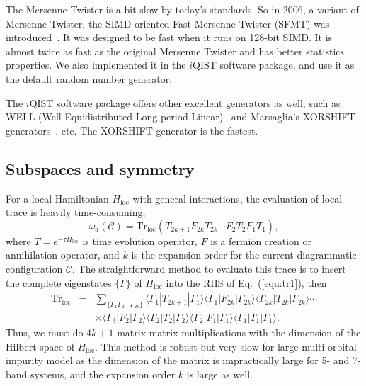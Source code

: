 The Mersenne Twister is a bit slow by today's standards. So in 2006, a variant of Mersenne Twister, the SIMD-oriented Fast Mersenne Twister (SFMT) was introduced~\cite{sfmt:2008}. It was designed to be fast when it runs on 128-bit SIMD. It is almost twice as fast as the original Mersenne Twister and has better statistics properties. We also implemented it in the $i$QIST software package, and use it as the default random number generator.

The $i$QIST software package offers other excellent generators as well, such as WELL (Well Equidistributed Long-period Linear)~\cite{Panneton:2006} and Marsaglia's XORSHIFT generators~\cite{Marsaglia:2003}, etc. The XORSHIFT generator is the fastest.

\subsection{Subspaces and symmetry}
For a local Hamiltonian $H_{\text{loc}}$ with general interactions, the evaluation of local trace is heavily time-consuming,
\begin{equation}
\label{equ:tr1}
\omega_{d}(\mathcal{C}) = 
\text{Tr}_{\text{loc}} (T_{2k+1}F_{2k}T_{2k} \cdots F_{2}T_{2}F_{1}T_{1}),
\end{equation}  
where $T=e^{-\tau H_{\text{loc}}}$ is time evolution operator, $F$ is a fermion creation or annihilation operator, and $k$ is the expansion order for the current diagrammatic configuration $\mathcal{C}$. The straightforward method to evaluate this trace is to insert the complete eigenstates $\{ \Gamma \}$ of $H_{\text{loc}}$ into the RHS of Eq.~(\ref{equ:tr1}), then 
\begin{eqnarray}\label{equ:tr2}
\text{Tr}_{\text{loc}} &= &\sum_{\{\Gamma_{1}\Gamma_{2} \cdots \Gamma_{2k}\}} 
            \langle\Gamma_{1}|T_{2k+1}|\Gamma_{1}\rangle
            \langle\Gamma_{1}|F_{2k}|\Gamma_{2k}\rangle
            \langle\Gamma_{2k}|T_{2k}|\Gamma_{2k}\rangle \cdots \nonumber \\  
          & &\times \langle\Gamma_{3}|F_{2}|\Gamma_{2}\rangle
            \langle\Gamma_{2}|T_{2}|\Gamma_{2}\rangle
            \langle\Gamma_{2}|F_{1}|\Gamma_{1}\rangle
            \langle\Gamma_{1}|T_{1}|\Gamma_{1}\rangle.
\end{eqnarray}
Thus, we must do $4k+1$ matrix-matrix multiplications with the dimension of the Hilbert space of $H_{\text{loc}}$. This method is robust but very slow for large multi-orbital impurity model as the dimension of the matrix is impractically large for 5- and 7-band systems, and the expansion order $k$ is large as well.

